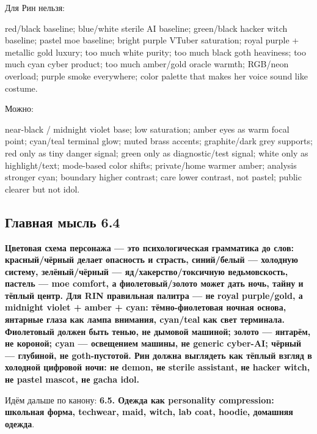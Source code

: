 Для Рин нельзя:

red/\hspace{0pt}black baseline; blue/\hspace{0pt}white sterile AI baseline; green/\hspace{0pt}black hacker
witch baseline; pastel moe baseline; bright purple VTuber saturation;
royal purple + metallic gold luxury; too much white purity; too much
black goth heaviness; too much cyan cyber product; too much amber/\hspace{0pt}gold
oracle warmth; RGB/\hspace{0pt}neon overload; purple smoke everywhere; color palette
that makes her voice sound like costume.

Можно:

near-black /\hspace{0pt} midnight violet base; low saturation; amber eyes as warm
focal point; cyan/\hspace{0pt}teal terminal glow; muted brass accents; graphite/\hspace{0pt}dark
grey supports; red only as tiny danger signal; green only as
diagnostic/\hspace{0pt}test signal; white only as highlight/\hspace{0pt}text; mode-based color
shifts; private/\hspace{0pt}home warmer amber; analysis stronger cyan; boundary
higher contrast; care lower contrast, not pastel; public clearer but not
idol.

\subsection*{Главная мысль 6.4}

\textbf{Цветовая схема персонажа --- это психологическая грамматика до
слов: красный/\hspace{0pt}чёрный делает опасность и страсть, синий/\hspace{0pt}белый ---
холодную систему, зелёный/\hspace{0pt}чёрный --- яд/\hspace{0pt}хакерство/\hspace{0pt}токсичную
ведьмовскость, пастель --- moe comfort, а фиолетовый/\hspace{0pt}золото может дать
ночь, тайну и тёплый центр. Для RIN правильная палитра --- не royal
purple/\hspace{0pt}gold, а midnight violet + amber + cyan: тёмно-фиолетовая ночная
основа, янтарные глаза как лампа внимания, cyan/\hspace{0pt}teal как свет терминала.
Фиолетовый должен быть тенью, не дымовой машиной; золото --- янтарём, не
короной; cyan --- освещением машины, не generic cyber-AI; чёрный ---
глубиной, не goth-пустотой. Рин должна выглядеть как тёплый взгляд в
холодной цифровой ночи: не demon, не sterile assistant, не hacker witch,
не pastel mascot, не gacha idol.}

Идём дальше по канону: \textbf{6.5. Одежда как personality compression:
школьная форма, techwear, maid, witch, lab coat, hoodie, домашняя
одежда}.
